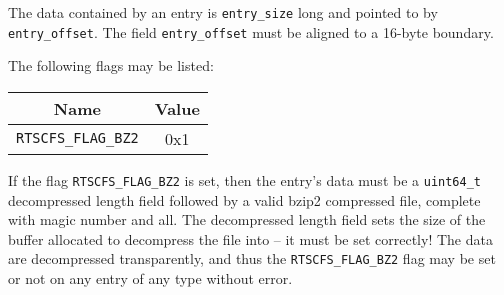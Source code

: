 \documentclass[10pt]{book}
\begin{document}
The data contained by an entry is \texttt{entry\_size} long and pointed to by \texttt{entry\_offset}.
The field \texttt{entry\_offset} must be aligned to a 16-byte boundary.

The following flags may be listed:
\begin{center}
\begin{tabular}{ c | c }
	Name & Value \\\hline
	\texttt{RTSCFS\_FLAG\_BZ2} & 0x1
\end{tabular}
\end{center}
If the flag \texttt{RTSCFS\_FLAG\_BZ2} is set, then the entry's data must be a \texttt{uint64\_t} decompressed length field followed by a valid bzip2 compressed file, complete with magic number and all.
The decompressed length field sets the size of the buffer allocated to decompress the file into -- it must be set correctly!
The data are decompressed transparently, and thus the \texttt{RTSCFS\_FLAG\_BZ2} flag may be set or not on any entry of any type without error.
\end{document}
